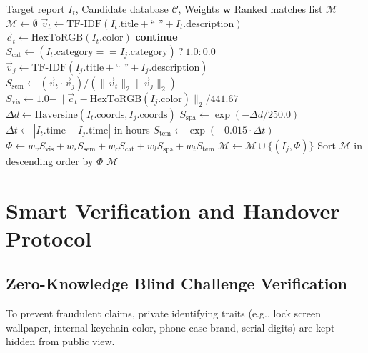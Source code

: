 \documentclass[conference]{IEEEtran}
\begin{document}
\begin{algorithm}[htbp]
\caption{FINDORA Multimodal Candidate Matching}
\label{alg:multimodal}
\begin{algorithmic}[1]
\REQUIRE Target report $I_t$, Candidate database $\mathcal{C}$, Weights $\mathbf{w}$
\ENSURE Ranked matches list $\mathcal{M}$
\STATE $\mathcal{M} \leftarrow \emptyset$
\STATE $\vec{v}_t \leftarrow \text{TF-IDF}(I_t.\text{title} + \text{`` ''} + I_t.\text{description})$
\STATE $\vec{c}_t \leftarrow \text{HexToRGB}(I_t.\text{color})$
        \STATE \textbf{continue} 
    \ENDIF
    \STATE $S_{\text{cat}} \leftarrow (I_t.\text{category} == I_j.\text{category}) \ ? \ 1.0 : 0.0$
    \STATE $\vec{v}_j \leftarrow \text{TF-IDF}(I_j.\text{title} + \text{`` ''} + I_j.\text{description})$
    \STATE $S_{\text{sem}} \leftarrow (\vec{v}_t \cdot \vec{v}_j) / (\|\vec{v}_t\|_2 \|\vec{v}_j\|_2)$
    \STATE $S_{\text{vis}} \leftarrow 1.0 - \|\vec{c}_t - \text{HexToRGB}(I_j.\text{color})\|_2 / 441.67$
    \STATE $\Delta d \leftarrow \text{Haversine}(I_t.\text{coords}, I_j.\text{coords})$
    \STATE $S_{\text{spa}} \leftarrow \exp(-\Delta d / 250.0)$
    \STATE $\Delta t \leftarrow |I_t.\text{time} - I_j.\text{time}|$ in hours
    \STATE $S_{\text{tem}} \leftarrow \exp(-0.015 \cdot \Delta t)$
    \STATE $\Phi \leftarrow w_v S_{\text{vis}} + w_s S_{\text{sem}} + w_c S_{\text{cat}} + w_l S_{\text{spa}} + w_t S_{\text{tem}}$
        \STATE $\mathcal{M} \leftarrow \mathcal{M} \cup \{(I_j, \Phi)\}$
    \ENDIF
\ENDFOR
\STATE Sort $\mathcal{M}$ in descending order by $\Phi$
\RETURN $\mathcal{M}$
\end{algorithmic}
\end{algorithm}

\section{Smart Verification and Handover Protocol}

\subsection{Zero-Knowledge Blind Challenge Verification}
To prevent fraudulent claims, private identifying traits (e.g., lock screen wallpaper, internal keychain color, phone case brand, serial digits) are kept hidden from public view. 
\end{document}
